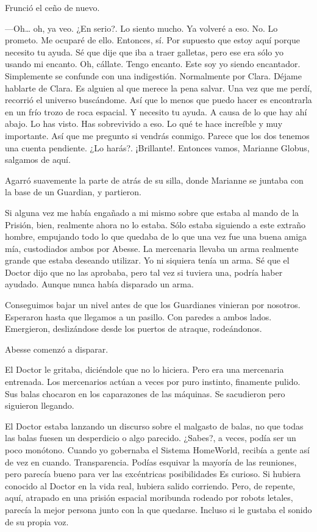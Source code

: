 Frunció el ceño de nuevo.

---Oh\ldots{} oh, ya veo. ¿En serio?. Lo siento mucho. Ya volveré a eso.
No. Lo prometo. Me ocuparé de ello. Entonces, sí. Por supuesto que estoy
aquí porque necesito tu ayuda. Sé que dije que iba a traer galletas,
pero ese era sólo yo usando mi encanto. Oh, cállate. Tengo encanto. Este
soy yo siendo encantador. Simplemente se confunde con una indigestión.
Normalmente por Clara. Déjame hablarte de Clara. Es alguien al que
merece la pena salvar. Una vez que me perdí, recorrió el universo
buscándome. Así que lo menos que puedo hacer es encontrarla en un frío
trozo de roca espacial. Y necesito tu ayuda. A causa de lo que hay ahí
abajo. Lo has visto. Has sobrevivido a eso. Lo qué te hace increíble y
muy importante. Así que me pregunto si vendrás conmigo. Parece que los
dos tenemos una cuenta pendiente. ¿Lo harás?. ¡Brillante!. Entonces
vamos, Marianne Globus, salgamos de aquí.

Agarró suavemente la parte de atrás de su silla, donde Marianne se
juntaba con la base de un Guardian, y partieron.

Si alguna vez me había engañado a mi mismo sobre que estaba al mando de
la Prisión, bien, realmente ahora no lo estaba. Sólo estaba siguiendo a
este extraño hombre, empujando todo lo que quedaba de lo que una vez fue
una buena amiga mía, custodiados ambos por Abesse. La mercenaria llevaba
un arma realmente grande que estaba deseando utilizar. Yo ni siquiera
tenía un arma. Sé que el Doctor dijo que no las aprobaba, pero tal vez
si tuviera una, podría haber ayudado. Aunque nunca había disparado un
arma.

Conseguimos bajar un nivel antes de que los Guardianes vinieran por
nosotros. Esperaron hasta que llegamos a un pasillo. Con paredes a ambos
lados. Emergieron, deslizándose desde los puertos de atraque,
rodeándonos.

Abesse comenzó a disparar.

El Doctor le gritaba, diciéndole que no lo hiciera. Pero era una
mercenaria entrenada. Los mercenarios actúan a veces por puro instinto,
finamente pulido. Sus balas chocaron en los caparazones de las máquinas.
Se sacudieron pero siguieron llegando.

El Doctor estaba lanzando un discurso sobre el malgasto de balas, no que
todas las balas fuesen un desperdicio o algo parecido. ¿Sabes?, a veces,
podía ser un poco monótono. Cuando yo gobernaba el Sistema HomeWorld,
recibía a gente así de vez en cuando. Transparencia. Podías esquivar la
mayoría de las reuniones, pero parecía bueno para ver las excéntricas
posibilidades Es curioso. Si hubiera conocido al Doctor en la vida real,
hubiera salido corriendo. Pero, de repente, aquí, atrapado en una
prisión espacial moribunda rodeado por robots letales, parecía la mejor
persona junto con la que quedarse. Incluso si le gustaba el sonido de su
propia voz.

